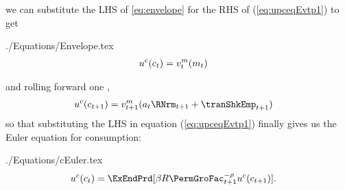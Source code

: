 \documentclass[SolvingMicroDSOPs]{subfiles}
\begin{document}
we can substitute the LHS of \eqref{eq:envelope} for the RHS of
(\ref{eq:upceqEvtp1}) to get
\begin{verbatimwrite}{./Equations/Envelope.tex}
  \begin{equation}\begin{gathered}\begin{aligned}
        u^{c}(c_{t})  & = {v}^{m}_{t}(m_{t})\label{eq:upcteqvtp}
      \end{aligned}\end{gathered}\end{equation}
\end{verbatimwrite}
\unskip
and rolling forward one {\interval},
\begin{equation}\begin{gathered}\begin{aligned}
      \uFunc^{\cNrm}(\cNrm_{\prd+1})  & = \vFunc^{\mNrm}_{\prd+1}({a}_{\prd}\RNrm_{\prd+1}+\tranShkEmp_{\prd+1}) \label{eq:upctp1EqVpxtp1}
    \end{aligned}\end{gathered}\end{equation}
so that substituting the LHS in equation (\ref{eq:upceqEvtp1}) finally gives us the Euler equation for consumption:
\begin{verbatimwrite}{./Equations/cEuler.tex}
  \begin{equation}\begin{gathered}\begin{aligned}
        \uFunc^{\cNrm}(\cNrm_{\prd})  & = \ExEndPrd[\DiscFac \Rfree \PermGroFac_{\prd+1}^{-\CRRA}\uFunc^{\cNrm}(\cNrm_{\prd+1})] \label{eq:cEuler}.
      \end{aligned}\end{gathered}\end{equation}
\end{verbatimwrite}
\unskip

\end{document}
